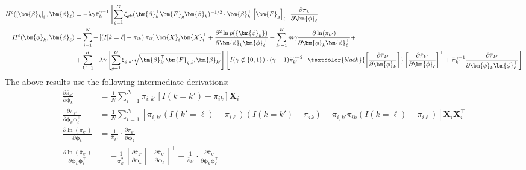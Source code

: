 \begin{align*}
	H^c(\left[\bm{\beta}_k\right]_i, \bm{\phi}_\ell) & = -\lambda \gamma \bar{\pi}^{\gamma-1}_k  \left[\sum_{g=1}^G \xi_{gk} (\bm{\beta}_k^\top\bm{F}_{g}\bm{\beta}_k)^{-1/2} \cdot  \bm{\beta}_k^\top \left[\bm{F}_{g}\right]_i \right] \frac{\partial \bar{\pi}_k}{\partial \bm{\phi}_\ell}  \\
	H^c(\bm{\phi}_k, \bm{\phi}_\ell) & =
   \sum_{i=1}^N -\left[\left(I[k=\ell] -
           \pi_{ik}\right)\pi_{i\ell}\right]\bm{X}_i\bm{X}_i^\top +
       \frac{\partial^2 \ln p(\{\bm{\phi}_k\})}{\partial
         \bm{\phi}_k\bm{\phi}_\ell^\top} + \sum_{k'=1}^K m \gamma
       \frac{\partial \ln(\bar{\pi}_{k'})}{\partial
         \bm{\phi}_k\bm{\phi}_\ell^\top} + \\
       &+ \sum_{k'=1}^K -\lambda\gamma\left[\sum_{g=1}^G \xi_{g,k'} \sqrt{\bm{\beta}_{k'}^\top\bm{F}_{g,k'}\bm{\beta}_{k'}}\right]\left[ I(\gamma \notin \{0,1\}) \cdot (\gamma-1) \bar{\pi}_{k'}^{\gamma-2} \cdot \textcolor{black}{\left[\frac{\partial \bar{\pi}_{k'}}{\partial \bm{\phi}_k}\right]}\left[\frac{\partial \bar{\pi}_{k'}}{\partial \bm{\phi}_\ell}\right]^\top  + \bar{\pi}_{k'}^{\gamma-1} \frac{\partial \bar{\pi}_{k'}}{\partial \bm{\phi}_k\bm{\phi}_\ell^\top} \right]
\end{align*}
The above results use the following intermediate derivations:
\begin{subequations}
	\begin{align*}
	\frac{\partial \bar{\pi}_{k'}}{\partial \bm{\phi}_k} &= \frac{1}{N} \sum_{i=1}^N \pi_{i,k'}\left[I(k=k') - \pi_{ik}\right] \bm{X}_i \\
	\frac{\partial \bar{\pi}_{k'}}{\partial \bm{\phi}_k\bm{\phi}_\ell^\top} &=\frac{1}{N}\sum_{i=1}^N\left[\pi_{i,k'}\left(I(k'=\ell) - \pi_{i\ell}\right)\left(I(k=k') - \pi_{ik}\right) -\pi_{i,k'}\pi_{ik}\left(I(k=\ell)- \pi_{i\ell}\right)\right] \bm{X}_i\bm{X}_i^\top
	\\
	\frac{\partial \ln(\bar{\pi}_{k'})}{\partial \bm{\phi}_k} &= \frac{1}{\bar{\pi}_{k'}} \cdot \frac{\partial \bar{\pi}_{k'}}{\partial \bm{\phi}_k} \\
	\frac{\partial \ln(\bar{\pi}_{k'})}{\partial \bm{\phi}_k\bm{\phi}_\ell^\top} &= -\frac{1}{\bar{\pi}_{k'}^{2}} \left[\frac{\partial \bar{\pi}_{k'}}{\partial \bm{\phi}_k}\right]\left[\frac{\partial \bar{\pi}_{k'}}{\partial \bm{\phi}_\ell}\right]^\top + \frac{1}{\bar{\pi}_{k'}} \cdot \frac{\partial \bar{\pi}_{k'}}{\partial \bm{\phi}_k\bm{\phi}_\ell^\top}
	\end{align*}
\end{subequations}
